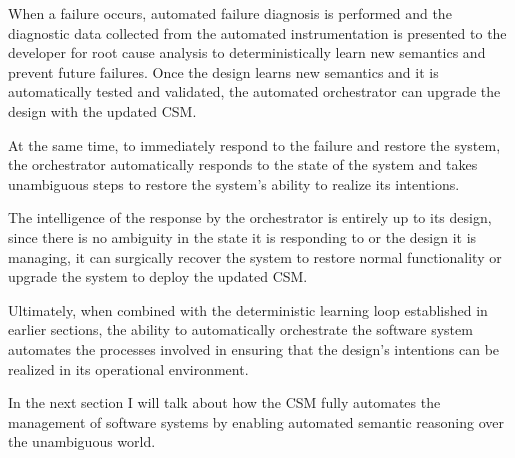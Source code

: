 When a failure occurs, automated failure diagnosis is performed and the diagnostic data collected from the automated instrumentation is presented to the developer for root cause analysis to deterministically learn new semantics and prevent future failures. Once the design learns new semantics and it is automatically tested and validated, the automated orchestrator can upgrade the design with the updated CSM.

At the same time, to immediately respond to the failure and restore the system, the orchestrator automatically responds to the state of the system and takes unambiguous steps to restore the system's ability to realize its intentions.

The intelligence of the response by the orchestrator is entirely up to its design, since there is no ambiguity in the state it is responding to or the design it is managing, it can surgically recover the system to restore normal functionality or upgrade the system to deploy the updated CSM.

Ultimately, when combined with the deterministic learning loop established in earlier sections, the ability to automatically orchestrate the software system automates the processes involved in ensuring that the design's intentions can be realized in its operational environment.

In the next section I will talk about how the CSM fully automates the management of software systems by enabling automated semantic reasoning over the unambiguous world.